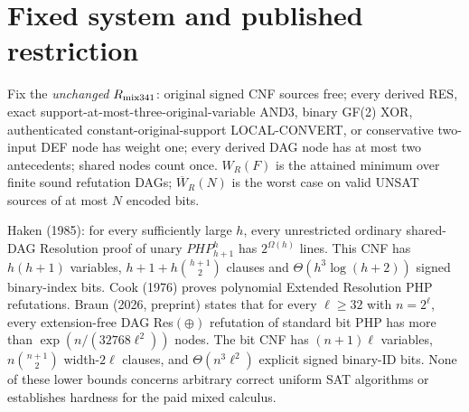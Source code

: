 \documentclass[11pt]{article}
\begin{document}
\section*{Fixed system and published restriction}
Fix the \emph{unchanged} $R_{\rm mix341}$: original signed CNF sources free; every derived RES, exact support-at-most-three-original-variable AND3, binary GF(2) XOR, authenticated constant-original-support LOCAL-CONVERT, or conservative two-input DEF node has weight one; every derived DAG node has at most two antecedents; shared nodes count once. $W_R(F)$ is the attained minimum over finite sound refutation DAGs; $\overline W_R(N)$ is the worst case on valid UNSAT sources of at most $N$ encoded bits.
\par Haken (1985): for every sufficiently large $h$, every unrestricted ordinary shared-DAG Resolution proof of unary $PHP_{h+1}^h$ has $2^{\Omega(h)}$ lines. This CNF has $h(h+1)$ variables, $h+1+h\binom{h+1}{2}$ clauses and $\Theta(h^3\log(h+2))$ signed binary-index bits. Cook (1976) proves polynomial Extended Resolution PHP refutations. Braun (2026, preprint) states that for every $\ell\ge32$ with $n=2^\ell$, every extension-free DAG Res$(\oplus)$ refutation of standard bit PHP has more than $\exp(n/(32768\ell^2))$ nodes. The bit CNF has $(n+1)\ell$ variables, $n\binom{n+1}{2}$ width-$2\ell$ clauses, and $\Theta(n^3\ell^2)$ explicit signed binary-ID bits. None of these lower bounds concerns arbitrary correct uniform SAT algorithms or establishes hardness for the paid mixed calculus.
\end{document}
